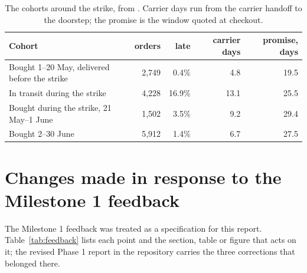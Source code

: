 \begin{table}[htbp]
\centering
\caption{The cohorts around the strike, from
. Carrier days run from the carrier
handoff to the doorstep; the promise is the window quoted at checkout.}
\label{tab:strike}
\small
\begin{tabular}{@{}lrrrr@{}}
\toprule
\textbf{Cohort} & \textbf{orders} & \textbf{late} & \textbf{carrier days} & \textbf{promise, days} \\
\midrule
Bought 1--20 May, delivered before the strike & 2{,}749 & 0.4\%  & 4.8  & 19.5 \\
In transit during the strike                  & 4{,}228 & 16.9\% & 13.1 & 25.5 \\
Bought during the strike, 21 May--1 June      & 1{,}502 & 3.5\%  & 9.2  & 29.4 \\
Bought 2--30 June                             & 5{,}912 & 1.4\%  & 6.7  & 27.5 \\
\bottomrule
\end{tabular}
\end{table}

\clearpage
\section{Changes made in response to the Milestone 1 feedback}
\label{app:feedback}

The Milestone 1 feedback was treated as a specification for this report.
Table~\ref{tab:feedback} lists each point and the section, table or figure that
acts on it; the revised Phase 1 report in the repository carries the three
corrections that belonged there.

